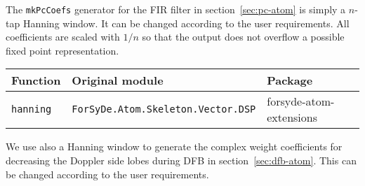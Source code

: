 \documentclass[
  a4paper,
]{article}
\newenvironment{Shaded}{}{}
\newcommand{\CommentTok}[1]{\textcolor[rgb]{0.38,0.63,0.69}{\textit{#1}}}
\newcommand{\DataTypeTok}[1]{\textcolor[rgb]{0.56,0.13,0.00}{#1}}
\newcommand{\FunctionTok}[1]{\textcolor[rgb]{0.02,0.16,0.49}{#1}}
\newcommand{\NormalTok}[1]{#1}
\newcommand{\OtherTok}[1]{\textcolor[rgb]{0.00,0.44,0.13}{#1}}
\begin{document}
The \texttt{mkPcCoefs} generator for the FIR filter in
section~\ref{sec:pc-atom} is simply a \(n\)-tap Hanning window. It can
be changed according to the user requirements. All coefficients are
scaled with \(1/n\) so that the output does not overflow a possible
fixed point representation.

\begin{Shaded}
\end{Shaded}

\begin{longtable}[]{@{}lll@{}}
\toprule
Function & Original module & Package\tabularnewline
\midrule
\endhead
\texttt{hanning} & \texttt{ForSyDe.Atom.Skeleton.Vector.DSP} &
forsyde-atom-extensions\tabularnewline
\bottomrule
\end{longtable}

\begin{Shaded}
\end{Shaded}

We use also a Hanning window to generate the complex weight coefficients
for decreasing the Doppler side lobes during DFB in
section~\ref{sec:dfb-atom}. This can be changed according to the user
requirements.

\begin{Shaded}
\end{Shaded}
\end{document}
